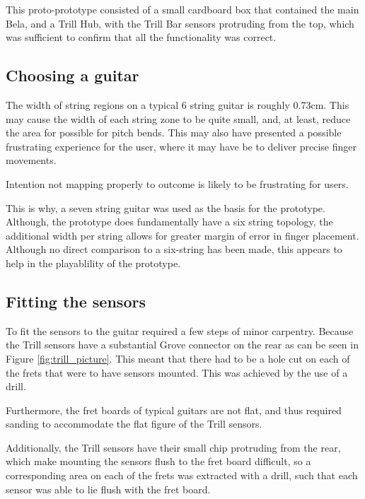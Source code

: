 This proto-prototype consisted of a small cardboard box that contained the main Bela, and a Trill Hub, with the Trill Bar sensors protruding from the top, which was sufficient to confirm that all the functionality was correct. 

\subsection{Choosing a guitar}
The width of string regions on a typical 6 string guitar is roughly 0.73cm. This may cause the width of each string zone to be quite small, and, at least, reduce the area for possible for pitch bends. This may also have presented a possible frustrating experience for the user, where it may have be to deliver precise finger movements.

Intention not mapping properly to outcome is likely to be frustrating for users. 

This is why, a seven string guitar was used as the basis for the prototype. Although, the prototype does fundamentally have a six string topology, the additional width per string allows for greater margin of error in finger placement. Although no direct comparison to a six-string has been made, this appears to help in the playablility of the prototype.

\subsection{Fitting the sensors}

To fit the sensors to the guitar required a few steps of minor carpentry. Because the Trill sensors have a substantial Grove connector on the rear as can be seen in Figure \ref{fig:trill_picture}. This meant that there had to be a hole cut on each of the frets that were to have sensors mounted. This was achieved by the use of a drill. 

Furthermore, the fret boards of typical guitars are not flat, and thus required sanding to accommodate the flat figure of the Trill sensors.

Additionally, the Trill sensors have their small chip protruding from the rear, which make mounting the sensors flush to the fret board difficult, so a corresponding area on each of the frets was extracted with a drill, such that each sensor was able to lie flush with the fret board. 